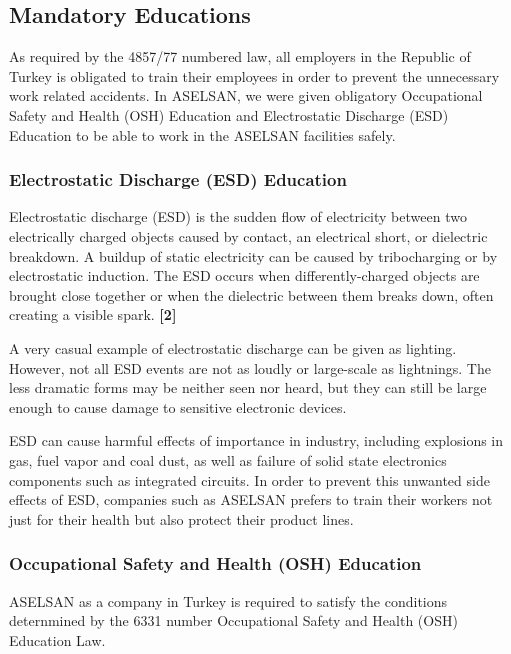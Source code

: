 \subsection{Mandatory Educations}
\- \indent
	As required by the 4857/77  numbered law, all employers in the Republic of Turkey is obligated to train their employees in order to prevent the unnecessary work related accidents. In ASELSAN, we were given obligatory Occupational Safety and Health (OSH) Education and Electrostatic Discharge (ESD) Education to be able to work in the ASELSAN facilities safely.
	
	
	
\subsubsection{Electrostatic Discharge (ESD) Education }
\- \indent

	Electrostatic discharge (ESD) is the sudden flow of electricity between two electrically charged objects caused by contact, an electrical short, or dielectric breakdown. A buildup of static electricity can be caused by tribocharging or by electrostatic induction. The ESD occurs when differently-charged objects are brought close together or when the dielectric between them breaks down, often creating a visible spark. \textbf{[2]}

	A very casual example of electrostatic discharge can be given as lighting. However, not all ESD events are not as loudly or large-scale as lightnings. The less dramatic forms  may be neither seen nor heard, but they can still be large enough to cause damage to sensitive electronic devices. 

	ESD can cause harmful effects of importance in industry, including explosions in gas, fuel vapor and coal dust, as well as failure of solid state electronics components such as integrated circuits. In order to prevent this unwanted side effects of ESD, companies such as ASELSAN prefers to train their workers not just for their health but also protect their product lines. 


\subsubsection{Occupational Safety and Health (OSH) Education}
\- \indent

	ASELSAN as a company in Turkey is required to satisfy the conditions deternmined by the 6331 number Occupational Safety and Health (OSH) Education Law. 
	
